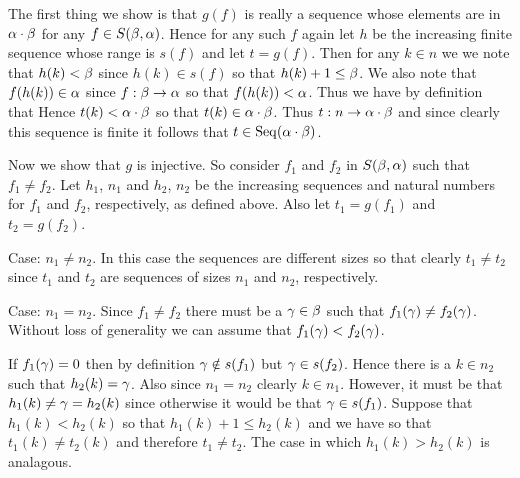 \begin{solution}
  The first thing we show is that $g(f)$ is really a sequence whose elements are in $\alpha \cdot \beta$ for any $f \in S(\beta, \alpha)$.
  Hence for any such $f$ again let $h$ be the increasing finite sequence whose range is $s(f)$ and let $t = g(f)$.
  Then for any $k \in n$ we we note that $h(k) < \beta$ since $h(k) \in s(f)$ so that $h(k) + 1 \leq \beta$.
  We also note that $f(h(k)) \in \alpha$ since $f: \beta \to \alpha$ so that $f(h(k)) < \alpha$.
  Thus we have by definition that
  Hence $t(k) < \alpha \cdot \beta$ so that $t(k) \in \alpha \cdot \beta$.
  Thus $t: n \to \alpha \cdot \beta$ and since clearly this sequence is finite it follows that $t \in \mathrm{Seq}(\alpha \cdot \beta)$.

  Now we show that $g$ is injective.
  So consider $f_1$ and $f_2$ in $S(\beta, \alpha)$ such that $f_1 \neq f_2$.
  Let $h_1$, $n_1$ and $h_2$, $n_2$ be the increasing sequences and natural numbers for $f_1$ and $f_2$, respectively, as defined above.
  Also let $t_1 = g(f_1)$ and $t_2 = g(f_2)$.

  Case: $n_1 \neq n_2$.
  In this case the sequences are different sizes so that clearly $t_1 \neq t_2$ since $t_1$ and $t_2$ are sequences of sizes $n_1$ and $n_2$, respectively.

  Case: $n_1 = n_2$.
  Since $f_1 \neq f_2$ there must be a $\gamma \in \beta$ such that $f_1(\gamma) \neq f_2(\gamma)$.
  Without loss of generality we can assume that $f_1(\gamma) < f_2(\gamma)$.

  If $f_1(\gamma) = 0$ then by definition $\gamma \notin s(f_1)$ but $\gamma \in s(f_2)$.
  Hence there is a $k \in n_2$ such that $h_2(k) = \gamma$.
  Also since $n_1 = n_2$ clearly $k \in n_1$.
  However, it must be that $h_1(k) \neq \gamma = h_2(k)$ since otherwise it would be that $\gamma \in s(f_1)$.
  Suppose that $h_1(k) < h_2(k)$ so that $h_1(k) + 1 \leq h_2(k)$ and we have
  so that $t_1(k) \neq t_2(k)$ and therefore $t_1 \neq t_2$.
  The case in which $h_1(k) > h_2(k)$ is analagous.


\end{solution}
